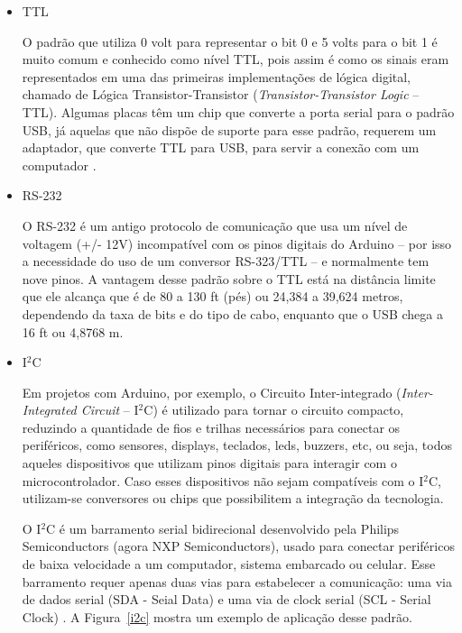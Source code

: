   \begin{itemize}
  \item{TTL} 
  
  O padrão que utiliza 0 volt para representar o bit 0 e 5 volts para o bit 1 é muito comum e conhecido como nível TTL, pois assim é como os sinais eram representados em uma das primeiras implementações de lógica digital, chamado de Lógica Transistor-Transistor (\textit{Transistor-Transistor Logic} -- TTL).
  Algumas placas têm um chip que converte a porta serial para o padrão USB, já aquelas que não dispõe de suporte para esse padrão, requerem um adaptador, que converte TTL para USB, para servir a conexão com um computador \cite{arduinocookbook}.
 
  
  
  \item{RS-232}
  
  O RS-232 é um antigo protocolo de comunicação que usa um nível de voltagem (+/- 12V) incompatível com os pinos digitais do Arduino -- por isso a necessidade do uso de um conversor RS-323/TTL  -- e normalmente tem nove pinos. A vantagem desse padrão sobre o TTL está na distância limite que ele alcança que é de 80 a 130 ft (pés) ou 24,384 a 39,624 metros, dependendo da taxa de bits e do tipo de cabo, enquanto que o USB chega a 16 ft ou 4,8768 m.


 \item{I$^{2}$C}
 
   Em projetos com Arduino, por exemplo, o Circuito Inter-integrado (\textit{Inter-Integrated Circuit} -- I$^{2}$C) é utilizado para tornar o circuito compacto, reduzindo a quantidade de fios e trilhas necessários para conectar os periféricos, como sensores, displays, teclados, leds, buzzers, etc, ou seja, todos aqueles dispositivos que utilizam pinos digitais para interagir com o microcontrolador. Caso esses dispositivos não sejam compatíveis com o I$^2$C, utilizam-se conversores ou chips que possibilitem a integração da tecnologia.
 
 
   O I$^{2}$C é um barramento serial bidirecional desenvolvido pela Philips Semiconductors (agora NXP Semiconductors), usado para conectar periféricos de baixa velocidade a um computador, sistema embarcado ou celular. Esse barramento requer apenas duas vias para estabelecer a comunicação: uma via de dados serial (SDA - Seial Data) e uma via de clock serial (SCL - Serial Clock) \cite{i2c}. A Figura~\ref{i2c} mostra um exemplo de aplicação desse padrão.
 

\end{itemize}
